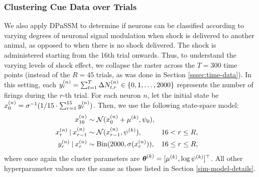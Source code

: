 \documentclass[twoside]{article}
\begin{document}
\subsubsection{Clustering Cue Data over Trials} \label{cue-cluster}%
We also apply DPnSSM to determine if neurons can be classified according to varying degrees of neuronal signal modulation when shock is delivered to another animal, as opposed to when there is no shock delivered. The shock is administered starting from the 16th trial onwards. Thus, to understand the varying levels of shock effect, we collapse the raster across the $T = 300$ time points (instead of the $R = 45$ trials, as was done in Section \ref{sssec:time-data}). In this setting, each $\idx[r] y n = \sum_{t=1}^T \Delta \idx[t, r] N n \in \{0, 1, \ldots, 2000\}$ represents the number of firings during the $r$-th trial.  For each neuron $n$, let the initial state be $\idx[0] x n = \sigma^{-1}(1 / 15 \cdot \sum_{r=1}^{15} \idx[r] y n)$.  Then, we use the following state-space model: 
\begin{align}
\idx[16] x n &\sim \Norm(\idx[0] x n + \idx \mu k, \psi_0),\\
\idx[r] x n \given \idx[r-1] x n &\sim \Norm(\idx[r-1] x n, \idx \psi k), & & 16 < r \leq R , \nonumber \\
\idx[r] y n \given \idx[r] x n &\sim \text{Bin}(2000, \sigma(\idx[r] x n)), & & 16 \leq r \leq R, \nonumber
\end{align} 
where once again the cluster parameters are $\bidx \theta k = [\idx \mu k, \log \idx \psi k]^\top$.  All other hyperparameter values are the same as those listed in Section \ref{sim-model-details}.  
\end{document}
